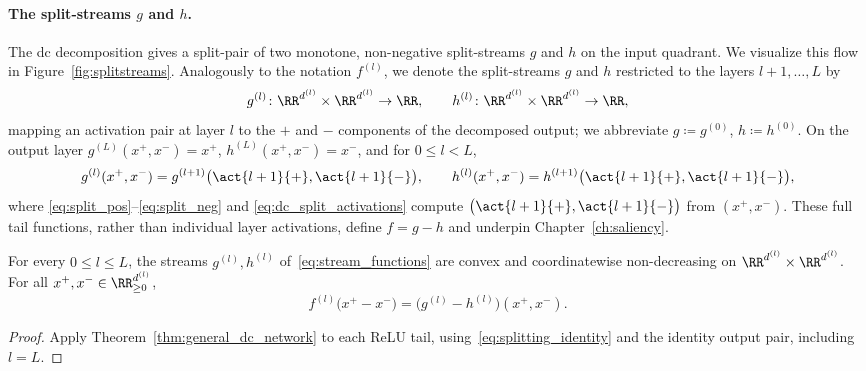 \paragraph{The split-streams $g$ and $h$.}
The \ac{dc} decomposition gives a split-pair of two monotone, non-negative split-streams $g$ and $h$ on the input quadrant. We visualize this flow in Figure~\ref{fig:splitstreams}. Analogously to the notation $f^{(l)}$, we denote the split-streams $g$ and $h$ restricted to the layers $l+1,\dots,L$ by
\begin{equation}
	g^{(l)} \colon \RR^{d^{(l)}} \times \RR^{d^{(l)}} \to \RR,
	\qquad
	h^{(l)} \colon \RR^{d^{(l)}} \times \RR^{d^{(l)}} \to \RR,
	\label{eq:stream_functions}
\end{equation}
mapping an activation pair at layer $l$ to the $+$ and $-$ components of the decomposed output; we abbreviate $g \coloneqq g^{(0)}$, $h \coloneqq h^{(0)}$. On the output layer $g^{(L)}(x^+, x^-) = x^+$, $h^{(L)}(x^+, x^-) = x^-$, and for $0 \le l < L$,
\begin{equation}
	g^{(l)}(x^+, x^-) = g^{(l+1)}\bigl(\act{l+1}{+}, \act{l+1}{-}\bigr),
	\qquad
	h^{(l)}(x^+, x^-) = h^{(l+1)}\bigl(\act{l+1}{+}, \act{l+1}{-}\bigr),
	\label{eq:stream_recursion}
\end{equation}
where \eqref{eq:split_pos}--\eqref{eq:split_neg} and \eqref{eq:dc_split_activations} compute $\bigl(\act{l+1}{+}, \act{l+1}{-}\bigr)$ from $(x^+,x^-)$. These full tail functions, rather than individual layer activations, define $f=g-h$ and underpin Chapter~\ref{ch:saliency}.

\begin{theoremenv}\label{thm:split_correct}
For every $0\le l\le L$, the streams $g^{(l)},h^{(l)}$ of~\eqref{eq:stream_functions} are convex and coordinatewise non-decreasing on $\RR^{d^{(l)}}\times\RR^{d^{(l)}}$. For all $x^+,x^-\in\RR^{d^{(l)}}_{\ge0}$,
\begin{equation}
	f^{(l)}\bigl(x^+-x^-\bigr)=\bigl(g^{(l)}-h^{(l)}\bigr)(x^+,x^-).
	\label{eq:split_correctness}
\end{equation}
\end{theoremenv}
\begin{proof}
Apply Theorem~\ref{thm:general_dc_network} to each ReLU tail, using~\eqref{eq:splitting_identity} and the identity output pair, including $l=L$.
\end{proof}


